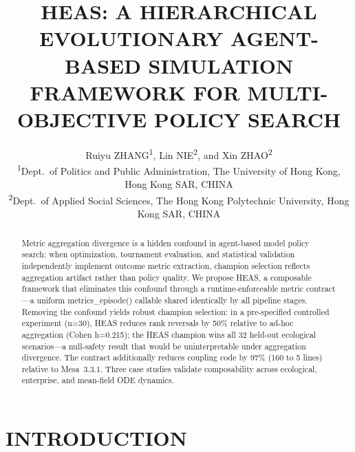\documentclass{wscpaperproc}
\begin{document}

\title{HEAS: A HIERARCHICAL EVOLUTIONARY AGENT-BASED SIMULATION FRAMEWORK
       FOR MULTI-OBJECTIVE POLICY SEARCH}

\author{\begin{center}Ruiyu ZHANG\textsuperscript{1}, Lin NIE\textsuperscript{2}, and Xin ZHAO\textsuperscript{2}\\
[11pt]
\textsuperscript{1}Dept.~of Politics and Public Administration, The University of Hong Kong, Hong Kong SAR, CHINA\\
\textsuperscript{2}Dept.~of Applied Social Sciences, The Hong Kong Polytechnic University, Hong Kong SAR, CHINA\end{center}
}

\maketitle

\vspace{-12pt}

\begin{abstract}
Metric aggregation divergence is a hidden confound in agent-based model policy
search: when optimization, tournament evaluation, and statistical validation
independently implement outcome metric extraction, champion selection reflects
aggregation artifact rather than policy quality. We propose HEAS, a composable
framework that eliminates this confound through a runtime-enforceable metric
contract---a uniform metrics\_episode() callable shared identically by all
pipeline stages. Removing the confound yields robust champion selection: in a
pre-specified controlled experiment (n=30), HEAS reduces rank reversals by 50\%
relative to ad-hoc aggregation (Cohen h=0.215); the HEAS champion wins all 32
held-out ecological scenarios---a null-safety result that would be
uninterpretable under aggregation divergence. The contract additionally reduces
coupling code by 97\% (160 to 5 lines) relative to Mesa~3.3.1. Three case
studies validate composability across ecological, enterprise, and mean-field ODE
dynamics.
\end{abstract}

\section{INTRODUCTION}
\end{document}
